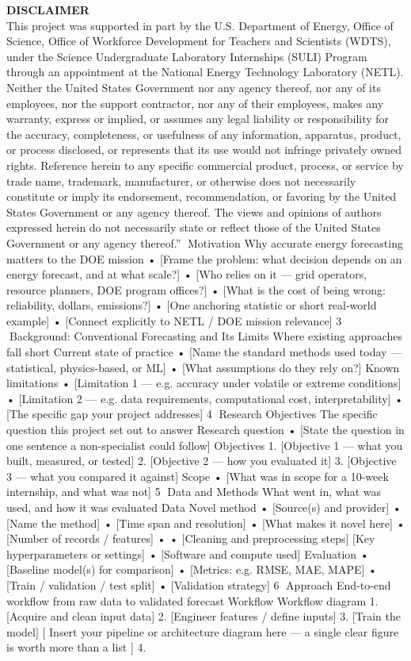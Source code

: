 \documentclass[12pt]{article} %
\begin{document}
\vspace{1em}
\noindent\textbf{DISCLAIMER}\\[0.3em]
\small This project was supported in part by the U.S. Department of Energy, Office of Science, Office of Workforce Development for Teachers and Scientists (WDTS), under the Science Undergraduate Laboratory Internships (SULI) Program through an appointment at the National Energy Technology Laboratory (NETL). Neither the United States Government nor any agency thereof, nor any of its employees, nor the support contractor, nor any of their employees, makes any warranty, express or implied, or assumes any legal liability or responsibility for the accuracy, completeness, or usefulness of any information, apparatus, product, or process disclosed, or represents that its use would not infringe privately owned rights. Reference herein to any specific commercial product, process, or service by trade name, trademark, manufacturer, or otherwise does not necessarily constitute or imply its endorsement, recommendation, or favoring by the United States Government or any agency thereof. The views and opinions of authors expressed herein do not necessarily state or reflect those of the United States Government or any agency thereof.” Motivation Why accurate energy forecasting matters to the DOE mission • [Frame the problem: what decision depends on an energy forecast, and at what scale?] • [Who relies on it — grid operators, resource planners, DOE program offices?] • [What is the cost of being wrong: reliability, dollars, emissions?] • [One anchoring statistic or short real-world example] • [Connect explicitly to NETL / DOE mission relevance] 3 Background: Conventional Forecasting and Its Limits Where existing approaches fall short Current state of practice • [Name the standard methods used today — statistical, physics-based, or ML] • [What assumptions do they rely on?] Known limitations • [Limitation 1 — e.g. accuracy under volatile or extreme conditions] • [Limitation 2 — e.g. data requirements, computational cost, interpretability] • [The specific gap your project addresses] 4 Research Objectives The specific question this project set out to answer Research question • [State the question in one sentence a non-specialist could follow] Objectives 1. [Objective 1 — what you built, measured, or tested] 2. [Objective 2 — how you evaluated it] 3. [Objective 3 — what you compared it against] Scope • [What was in scope for a 10-week internship, and what was not] 5 Data and Methods What went in, what was used, and how it was evaluated Data Novel method • [Source(s) and provider] • [Name the method] • [Time span and resolution] • [What makes it novel here] • [Number of records / features] • • [Cleaning and preprocessing steps] [Key hyperparameters or settings] • [Software and compute used] Evaluation • [Baseline model(s) for comparison] • [Metrics: e.g. RMSE, MAE, MAPE] • [Train / validation / test split] • [Validation strategy] 6 Approach End-to-end workflow from raw data to validated forecast Workflow Workflow diagram 1. [Acquire and clean input data] 2. [Engineer features / define inputs] 3. [Train the model] [ Insert your pipeline or architecture diagram here — a single clear figure is worth more than a list ] 4. 
\end{document}
